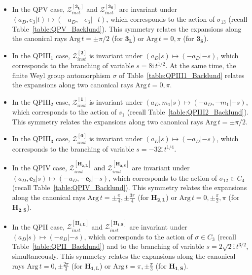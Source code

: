 \documentclass[12pt,a4paper]{article}
\numberwithin{equation}{section}
\newcommand{\ri}{\mathrm{i}}
\newcommand{\D}{\scriptscriptstyle{D}}
\begin{document}
\begin{itemize}
    \item In the QPV case, $\mathcal{Z}_{inst}^{[\mathbf{3_L}]}$ \cite[(4.14)]{BST25} and $\mathcal{Z}_{inst}^{[\mathbf{3_S}]}$ \cite[(4.30)]{BST25} are invariant under $(a_{\D},e_3|t)\mapsto {(-a_{\D},-e_3|-t)}$, which corresponds to the action of $\sigma_{13}$ (recall Table~\ref{table:QPV_Backlund}). This symmetry relates the expansions along the canonical rays $\mathrm{Arg}\, t=\pm\pi/2$ (for $\mathbf{3_L}$) or $\mathrm{Arg}\, t=0,\pi$ (for $\mathbf{3_S}$).
    
    \item In the QPIII$_1$ case, $\mathcal{Z}_{inst}^{[\mathbf{2}]}$ \cite[(4.41)]{BST25} is invariant under $(a_{\D}|s)\mapsto (-a_{\D}|-s)$, which corresponds to the branching of variable $s=8\ri\, t^{1/2}$.
    At the same time, the finite Weyl group automorphism $\sigma$ of Table~\ref{table:QPIII1_Backlund} relates the expansions along two canonical rays $\mathrm{Arg}\, t=0,\pi$.

    \item In the QPIII$_2$ case, $\mathcal{Z}_{inst}^{[\mathbf{1}]}$ \cite[(4.55)]{BST25} is invariant under $(a_{\D},m_1|s)\mapsto (-a_{\D},-m_1|-s)$, which corresponds to the action of $s_1$ (recall Table~\ref{table:QPIII2_Backlund}). This symmetry relates the expansions along two canonical rays $\mathrm{Arg}\, t=\pm\pi/2$.

   \item In the QPIII$_3$ case, $\mathcal{Z}_{inst}^{[\mathbf{0}]}$ \cite[(4.69)]{BST25} is invariant under $(a_{\D}|s)\mapsto (-a_{\D}|-s)$, which corresponds to the branching of variable $s=-32\ri\, t^{1/4}$.

   \item In the QPIV case, $\mathcal{Z}_{inst}^{[\mathbf{H_{2,L}}]}$ \cite[(4.85)]{BST25} and $\mathcal{Z}_{inst}^{[\mathbf{H_{2,S}}]}$ \cite[(4.102)]{BST25} are invariant under $(a_{\D},\boldsymbol{e}_3|s)\mapsto (-a_{\D},-\boldsymbol{e}_3|-s)$, which corresponds to the action of $\sigma_{12}\in C_4$ (recall Table~\ref{table:QPIV_Backlund}). This symmetry relates the expansions along the canonical rays $\mathrm{Arg}\, t=\pm \frac\pi4,\pm\frac{3\pi}4$ (for $\mathbf{H_{2,L}}$) or $\mathrm{Arg}\, t=0,\pm \frac\pi2,\pi$ (for $\mathbf{H_{2,S}}$).

   \item In the QPII case, $\mathcal{Z}_{inst}^{[\mathbf{H_{1,L}}]}$ \cite[(4.113)]{BST25} and $\mathcal{Z}_{inst}^{[\mathbf{H_{1,S}}]}$ \cite[(4.125)]{BST25} are invariant under $(a_{\D}|s)\mapsto {(-a_{\D}|-s)}$, which corresponds to the action of $\sigma\in C_3$ (recall Table~\ref{table:QPII_Backlund}) and to the branching of variable $s=2\sqrt2\ri\,t^{3/2}$, simultaneously. This symmetry relates the expansions along the canonical rays $\mathrm{Arg}\, t=0, \pm\frac{2\pi}3$ (for $\mathbf{H_{1,L}}$) or $\mathrm{Arg}\, t=\pi,\pm\frac\pi3$ (for $\mathbf{H_{1,S}}$).


\end{itemize}
\end{document}
